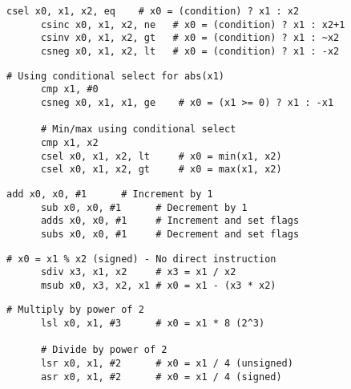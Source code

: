   \begin{definition}
    \begin{lstlisting}[language=arm]
      csel x0, x1, x2, eq    # x0 = (condition) ? x1 : x2
      csinc x0, x1, x2, ne   # x0 = (condition) ? x1 : x2+1
      csinv x0, x1, x2, gt   # x0 = (condition) ? x1 : ~x2
      csneg x0, x1, x2, lt   # x0 = (condition) ? x1 : -x2
    \end{lstlisting}
  \end{definition}

  \begin{definition}
    \begin{lstlisting}[language=arm]
      # Using conditional select for abs(x1)
      cmp x1, #0
      csneg x0, x1, x1, ge    # x0 = (x1 >= 0) ? x1 : -x1
      
      # Min/max using conditional select
      cmp x1, x2
      csel x0, x1, x2, lt     # x0 = min(x1, x2)
      csel x0, x1, x2, gt     # x0 = max(x1, x2)
    \end{lstlisting}
  \end{definition}

  \begin{definition}
    \begin{lstlisting}[language=arm]
      add x0, x0, #1      # Increment by 1
      sub x0, x0, #1      # Decrement by 1
      adds x0, x0, #1     # Increment and set flags
      subs x0, x0, #1     # Decrement and set flags
    \end{lstlisting}
  \end{definition}

  \begin{definition}
    \begin{lstlisting}[language=arm]
      # x0 = x1 % x2 (signed) - No direct instruction
      sdiv x3, x1, x2     # x3 = x1 / x2
      msub x0, x3, x2, x1 # x0 = x1 - (x3 * x2)
    \end{lstlisting}
  \end{definition}

  \begin{definition}
    \begin{lstlisting}[language=arm]
      # Multiply by power of 2
      lsl x0, x1, #3      # x0 = x1 * 8 (2^3)
      
      # Divide by power of 2
      lsr x0, x1, #2      # x0 = x1 / 4 (unsigned)
      asr x0, x1, #2      # x0 = x1 / 4 (signed)
    \end{lstlisting}
  \end{definition}


